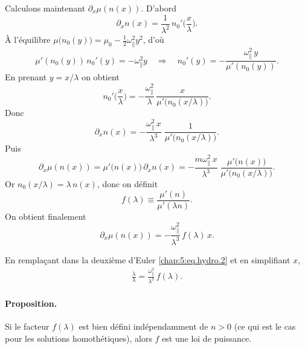 \medskip

Calculons maintenant \(\partial_x\mu(n(x))\). D'abord
\[
\partial_x n(x)=\frac{1}{\lambda^2}\,n_0'\!\Big(\frac{x}{\lambda}\Big).
\]
À l'équilibre \(\mu\big(n_0(y)\big)=\mu_0-\tfrac12 \omega_\parallel^2 y^2\), d'où
\[
\mu'(n_0(y))\,n_0'(y)=-\omega_\parallel^2 y
\quad\Rightarrow\quad
n_0'(y)=-\frac{\omega_\parallel^2\,y}{\mu'(n_0(y))}.
\]
En prenant \(y=x/\lambda\) on obtient
\[
n_0'\!\Big(\frac{x}{\lambda}\Big)
= -\frac{\omega_\parallel^2}{\lambda}\,\frac{x}{\mu'\big(n_0(x/\lambda)\big)}.
\]
Donc
\[
\partial_x n(x) = -\frac{\omega_\parallel^2\,x}{\lambda^3}\;
\frac{1}{\mu'\big(n_0(x/\lambda)\big)}.
\]
Puis
\[
\partial_x\mu(n(x))=\mu'\big(n(x)\big)\,\partial_x n(x)
= -\frac{m\omega_\parallel^2\,x}{\lambda^3}\;
\frac{\mu'\big(n(x)\big)}{\mu'\big(n_0(x/\lambda)\big)}.
\]
Or \(n_0(x/\lambda)=\lambda\,n(x)\), donc on définit
\[
f(\lambda)\equiv\frac{\mu'(n)}{\mu'(\lambda n)}.
\]
On obtient finalement
\[
\partial_x\mu(n(x)) = -\frac{\omega_\parallel^2}{\lambda^3}\,f(\lambda)\,x.
\]

En remplaçant dans la deuxième d'Euler \eqref{chap:5:eq.hydro.2} et en simplifiant  \(x\),
\begin{eqnarray}\label{chap:5:eq.hydro.3}
	\frac{\ddot\lambda}{\lambda}  
	 =  \frac{\omega_\parallel^2}{\lambda^3} \, f(\lambda)  .
\end{eqnarray}

\paragraph{Proposition.}
Si le facteur
\(
f(\lambda)
\)
est bien défini indépendamment de \(n>0\) (ce qui est le cas pour les solutions homothétiques),
alors \(f\) est une loi de puissance.

